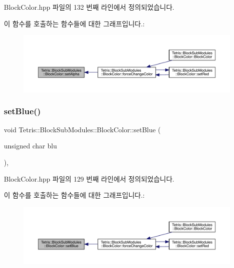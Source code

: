 Block\+Color.\+hpp 파일의 132 번째 라인에서 정의되었습니다.

이 함수를 호출하는 함수들에 대한 그래프입니다.\+:
\nopagebreak
\begin{figure}[H]
\begin{center}
\leavevmode
\includegraphics[width=350pt]{class_tetris_1_1_block_sub_modules_1_1_block_color_a5fdd2d1a53d92ec0bcc1c25748b890e0_icgraph}
\end{center}
\end{figure}
\mbox{\label{class_tetris_1_1_block_sub_modules_1_1_block_color_ac624156bd1f77a20d6e1d4c8cbff36d3}} 
\subsubsection{\texorpdfstring{set\+Blue()}{setBlue()}}
{\footnotesize\ttfamily void Tetris\+::\+Block\+Sub\+Modules\+::\+Block\+Color\+::set\+Blue (\begin{DoxyParamCaption}\item[{unsigned char}]{blu }\end{DoxyParamCaption})\hspace{0.3cm}{\ttfamily [inline]}, {\ttfamily [protected]}}



Block\+Color.\+hpp 파일의 129 번째 라인에서 정의되었습니다.

이 함수를 호출하는 함수들에 대한 그래프입니다.\+:
\nopagebreak
\begin{figure}[H]
\begin{center}
\leavevmode
\includegraphics[width=350pt]{class_tetris_1_1_block_sub_modules_1_1_block_color_ac624156bd1f77a20d6e1d4c8cbff36d3_icgraph}
\end{center}
\end{figure}
\mbox{\label{class_tetris_1_1_block_sub_modules_1_1_block_color_aeea8ab6d5f36d35fd4f28818349661ab}} 
